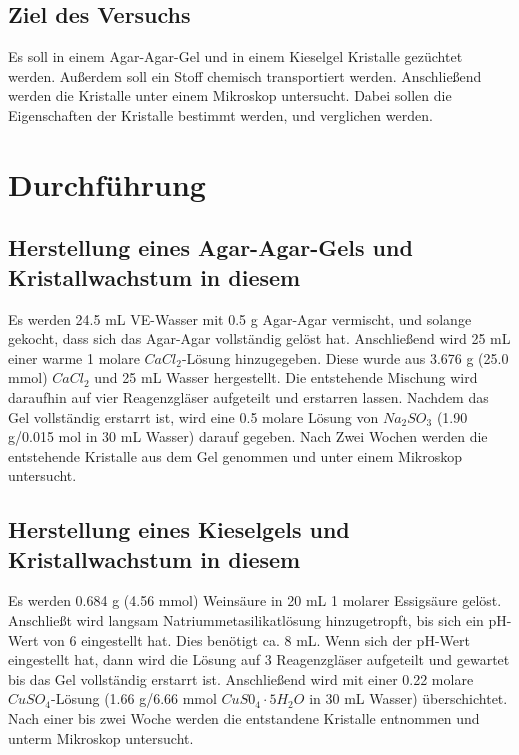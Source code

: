 \documentclass[12pt, a4paper]{article}
\begin{document}
\subsection{Ziel des Versuchs}
{Es soll in einem Agar-Agar-Gel und in einem Kieselgel Kristalle gezüchtet werden. Außerdem soll ein Stoff chemisch transportiert werden. 
Anschließend werden die Kristalle unter einem Mikroskop untersucht. Dabei sollen die Eigenschaften der Kristalle bestimmt werden, und verglichen werden. 

}






\newpage
\section{Durchführung}
\subsection{Herstellung eines Agar-Agar-Gels und Kristallwachstum in diesem}
{Es werden 24.5 mL VE-Wasser mit 0.5 g Agar-Agar vermischt, und solange gekocht, dass sich das Agar-Agar vollständig gelöst hat. Anschließend wird 25 mL einer warme 1 molare $CaCl_2$-Lösung hinzugegeben. 
Diese wurde aus 3.676 g (25.0 mmol) $CaCl_2$ und 25 mL Wasser hergestellt. Die entstehende Mischung wird daraufhin auf vier Reagenzgläser aufgeteilt und erstarren lassen. Nachdem das Gel vollständig erstarrt ist, 
wird eine 0.5 molare Lösung von $Na_2SO_3$ (1.90 g/0.015 mol in 30 mL Wasser) darauf gegeben. Nach Zwei Wochen werden die entstehende Kristalle aus dem Gel genommen und unter einem Mikroskop untersucht.\cite{Skript}

}


\subsection{Herstellung eines Kieselgels und Kristallwachstum in diesem}
{Es werden 0.684 g (4.56 mmol) Weinsäure in 20 mL 1 molarer Essigsäure gelöst. Anschließt wird langsam Natriummetasilikatlösung hinzugetropft, bis sich ein pH-Wert von 6 eingestellt hat. Dies benötigt ca. 8 mL. Wenn sich der pH-Wert 
eingestellt hat, dann wird die Lösung auf 3 Reagenzgläser aufgeteilt und gewartet bis das Gel vollständig erstarrt ist. Anschließend wird mit einer 0.22 molare $CuSO_4$-Lösung (1.66 g/6.66 mmol $CuS0_4\cdot 5 H_2O$ in 30 mL Wasser) 
überschichtet. Nach einer bis zwei Woche werden die entstandene Kristalle entnommen und unterm Mikroskop untersucht.\cite{Skript}
}
\end{document}
